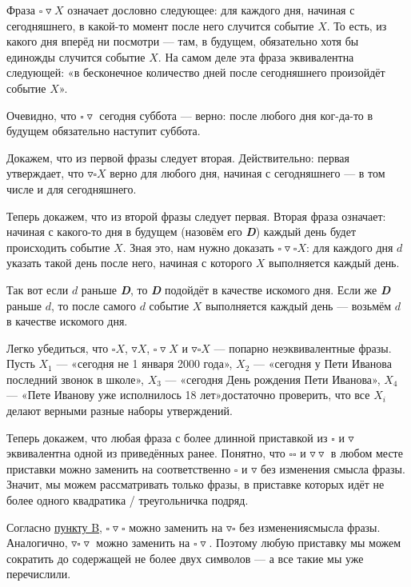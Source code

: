 \def\sq{\square}
\def\td{\triangledown}

\begin{itemize}
\itA Фраза $\sq\td X$ означает дословно следующее: для каждого дня, начиная с сегодняшнего, в какой-то момент после него случится событие $X$. То есть, из какого дня вперёд ни посмотри — там, в будущем, обязательно хотя бы единожды случится событие $X$. На самом деле эта фраза эквивалентна следующей: «в бесконечное количество дней после сегодняшнего произойдёт событие $X$».

Очевидно, что $\sq\td \text{ сегодня суббота}$ — верно: после любого дня ког-\linebreak да-то в будущем обязательно наступит суббота.

\itB \label{logicb} Докажем, что из первой фразы следует вторая. Действительно: первая утверждает, что $\td\sq X$ верно для любого дня, начиная с сегодняшнего — в том числе и для сегодняшнего.

Теперь докажем, что из второй фразы следует первая. Вторая фраза означает: начиная с какого-то дня в будущем (назовём его {\itshape\bfseries D}) каждый день будет происходить событие $X$. Зная это, нам нужно доказать $\sq\td\sq X$: для каждого дня $d$ указать такой день после него, начиная с которого $X$ выполняется каждый день.

Так вот если $d$ раньше {\itshape\bfseries D}, то {\itshape\bfseries D} подойдёт в качестве искомого дня. Если же {\itshape\bfseries D} раньше $d$, то после самого $d$ событие $X$ выполняется каждый день — возьмём $d$ в качестве искомого дня.

\itC Легко убедиться, что $\sq X$, $\td X$, $\sq\td X$ и $\td\sq X$ — попарно неэквивалентные фразы. Пусть $X_1$ — «сегодня не 1 января 2000 года», $X_2$ — «сегодня у Пети Иванова последний звонок в школе», $X_3$ — «сегодня День рождения Пети Иванова», $X_4$ — «Пете Иванову уже исполнилось 18 лет»\scolon достаточно проверить, что все $X_i$ делают верными разные наборы утверждений.

Теперь докажем, что любая фраза с более длинной приставкой из $\sq$ и $\td$ эквивалентна одной из приведённых ранее. Понятно, что $\sq\sq$ и $\td\td$ в любом месте приставки можно заменить на соответственно $\sq$ и $\td$ без изменения смысла фразы. Значит, мы можем рассматривать только фразы, в приставке которых идёт не более одного квадратика / треугольничка подряд.

Согласно \hyperref[logicb]{пункту B}, $\sq\td\sq$ можно заменить на $\td\sq$ без изменения\linebreak смысла фразы. Аналогично, $\td\sq\td$ можно заменить на $\sq\td$. Поэтому любую приставку мы можем сократить до содержащей не более двух символов — а все такие мы уже перечислили.

\end{itemize}